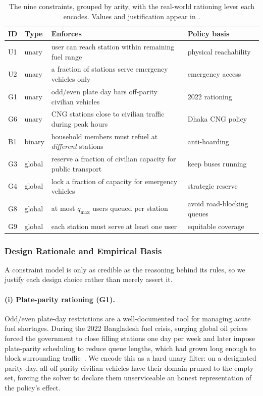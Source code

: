 \documentclass{ai-lab-report}
\begin{document}
\begin{table}[H]
\centering
\small
\begin{tabularx}{\linewidth}{@{}llXl@{}}
\toprule
ID & Type & Enforces & Policy basis \\
\midrule
U1 & unary  & user can reach station within remaining fuel range & physical reachability \\
U2 & unary  & a fraction of stations serve emergency vehicles only & emergency access \\
G1 & unary  & odd/even plate day bars off-parity civilian vehicles & 2022 rationing~\citep{thewire2022fuel} \\
G6 & unary  & CNG stations close to civilian traffic during peak hours & Dhaka CNG policy \\
B1 & binary & household members must refuel at \emph{different} stations & anti-hoarding \\
G3 & global & reserve a fraction of civilian capacity for public transport & keep buses running \\
G4 & global & lock a fraction of capacity for emergency vehicles & strategic reserve \\
G8 & global & at most $q_{\max}$ users queued per station & avoid road-blocking queues \\
G9 & global & each station must serve at least one user & equitable coverage \\
\bottomrule
\end{tabularx}
\caption{The nine constraints, grouped by arity, with the real-world rationing lever each encodes. Values and justification appear in .}
\label{tab:a2constraints}
\end{table}

\subsubsection{Design Rationale and Empirical Basis}
\label{sec:a2defend}

A constraint model is only as credible as the reasoning behind its rules, so we justify each design choice rather than merely assert it.

\paragraph{(i) Plate-parity rationing (G1).} Odd/even plate-day restrictions are a well-documented tool for managing acute fuel shortages. During the 2022 Bangladesh fuel crisis, surging global oil prices forced the government to close filling stations one day per week and later impose plate-parity scheduling to reduce queue lengths, which had grown long enough to block surrounding traffic~\citep{thewire2022fuel,dailystar2022fuelration}. We encode this as a hard unary filter: on a designated parity day, all off-parity civilian vehicles have their domain pruned to the empty set, forcing the solver to declare them unserviceable an honest representation of the policy's effect.
\end{document}
